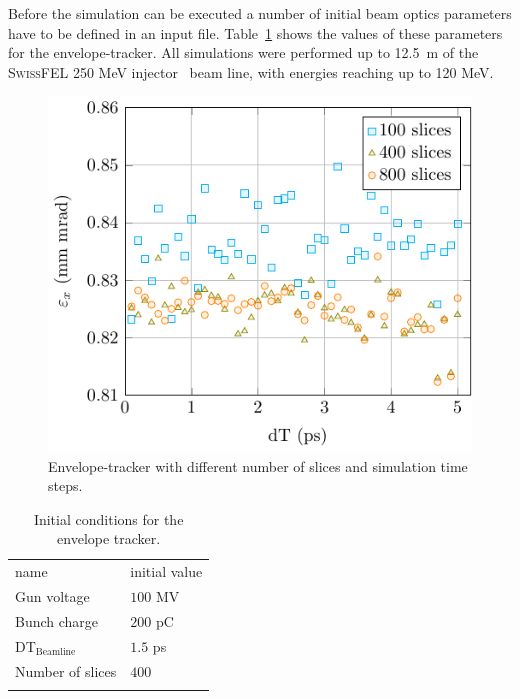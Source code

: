 Before the simulation can be executed a number of initial beam optics
  parameters have to be defined in an input file.
Table~\ref{tbl:et_params} shows the values of these parameters for the
  envelope-tracker.
All simulations were performed up to 12.5~m of the
  \textsc{SwissFEL} 250 MeV injector~\cite{pedr:10} beam line, with
  energies reaching  up to 120 MeV.

\begin{figure}[h!]
  \centering
  \includegraphics[width=0.8\linewidth]{Report/dt_scan}
  \caption{Envelope-tracker with different number of slices and simulation
    time steps.}
  \label{fig:et-dt}
\end{figure}

\begin{table}
  \begin{center}
    \caption{Initial conditions for the envelope tracker.}
    \label{tbl:et_params}
    \begin{tabular}{ll}
      \hline\noalign{\smallskip}
      name & initial value \\
      \noalign{\smallskip}\hline\noalign{\smallskip}
        Gun voltage       & $100$ MV\\
        Bunch charge      & $200$ pC\\
        DT$_{\text{Beamline}}$  & $1.5$ ps\\
        Number of slices  & $400$ \\
      \noalign{\smallskip}\hline
    \end{tabular}
  \end{center}
\end{table}

